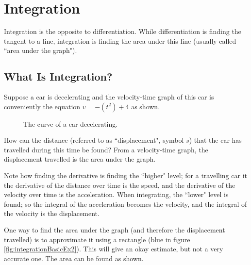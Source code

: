 \chapter{Integration}
Integration is the opposite to differentiation. While differentiation is finding the tangent to a line, integration is finding the area under this line (usually called ``area under the graph").

\section{What Is Integration?}
Suppose a car is decelerating and the velocity-time graph of this car is conveniently the equation $v=-\left(t^2\right)+4$ as shown.

\begin{figure}[h!]
	\centering
	\caption{The curve of a car decelerating.}
	\label{fig:integrationBasicEx1}
\end{figure}

How can the distance (referred to as ``displacement", symbol $s$) that the car has travelled during this time be found? From a velocity-time graph, the displacement travelled is the area under the graph.

Note how finding the derivative is finding the ``higher" level; for a travelling car it the derivative of the distance over time is the speed, and the derivative of the velocity over time is the acceleration. When integrating, the ``lower" level is found; so the integral of the acceleration becomes the velocity, and the integral of the velocity is the displacement.

One way to find the area under the graph (and therefore the displacement travelled) is to approximate it using a rectangle (blue in figure \ref{fig:integrationBasicEx2}). This will give an okay estimate, but not a very accurate one. The area can be found as shown.

